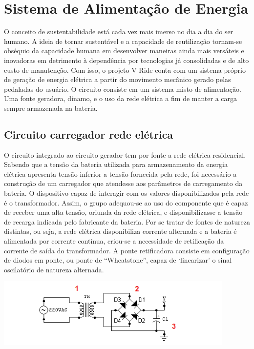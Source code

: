     \section{Sistema de Alimentação de Energia }

O conceito de sustentabilidade está cada vez mais imerso no dia a dia do ser humano. A ideia de tornar sustentável e a capacidade de reutilização tornam-se obséquio da capacidade humana em desenvolver maneiras ainda mais versáteis e inovadoras em detrimento à dependência por tecnologias já consolidadas e de alto custo de manutenção. Com isso, o projeto V-Ride conta com um sistema próprio de geração de energia elétrica a partir do movimento mecânico gerado pelas pedaladas do usuário. 
O circuito consiste em um sistema misto de alimentação. Uma fonte geradora, dínamo, e o uso da rede elétrica a fim de manter a carga sempre armazenada na bateria. 
    \subsection{Circuito carregador rede elétrica}  
O circuito integrado ao circuito gerador tem por fonte a rede elétrica residencial. Sabendo que a tensão da bateria utilizada para armazenamento da energia elétrica apresenta tensão inferior a tensão fornecida pela rede, foi necessário a construção de um carregador que atendesse aos parâmetros de carregamento da bateria. 
O dispositivo capaz de interagir com os valores disponibilizados pela rede é o transformador. Assim, o grupo adequou-se ao uso do componente que é capaz de receber uma alta tensão, oriunda da rede elétrica, e disponibilizasse a tensão de recarga indicada pelo fabricante da bateria. Por se tratar de fontes de natureza distintas, ou seja, a rede elétrica disponibiliza corrente alternada e a bateria é alimentada por corrente contínua, criou-se a necessidade de retificação da corrente de saída do transformador. A ponte retificadora consiste em configuração de diodos em ponte, ou ponte de “Wheatstone”, capaz de ‘linearizar’ o sinal oscilatório de natureza alternada. 
                                
            
 \begin{center}
    	\includegraphics[scale=0.7]{figuras/alternada}
        \label{alternada}
    \end{center}

